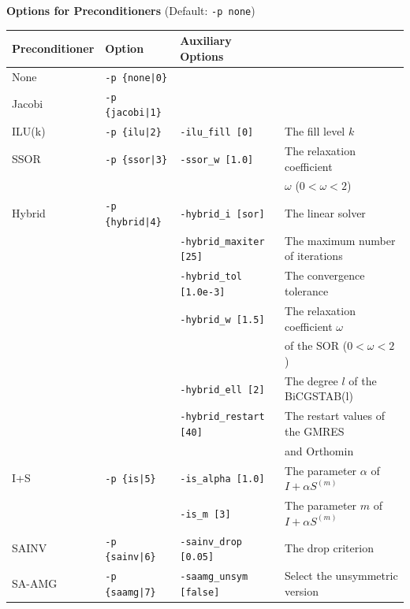 \documentclass[a4paper]{article}
\begin{document}
\begin{minipage}[t]{\textwidth}
\begin{center}
{\bf Options for Preconditioners} (Default: \verb=-p none=)\\
\begin{tabular}{l|lll}\hline\hline
Preconditioner   & Option           & Auxiliary Options \\ \hline
None     & \verb=-p {none|0}=    &   \\
Jacobi   & \verb=-p {jacobi|1}=  &     \\
ILU(k)   & \verb=-p {ilu|2}=     & \verb=-ilu_fill [0]=        & The fill level $k$ \\
SSOR     & \verb=-p {ssor|3}=    & \verb=-ssor_w [1.0]=        & The relaxation coefficient \\
         &                       &                             & $\omega$ ($0<\omega<2$) \\
Hybrid   & \verb=-p {hybrid|4}=  & \verb=-hybrid_i [sor]=      & The linear solver\\
         &                       & \verb=-hybrid_maxiter [25]= & The maximum number of iterations \\
         &                       & \verb=-hybrid_tol [1.0e-3]= & The convergence tolerance \\
         &                       & \verb=-hybrid_w [1.5]=      & The relaxation coefficient $\omega$ \\
         &                       &                             & of the SOR ($0<\omega<2$) \\
         &                       & \verb=-hybrid_ell [2]=      & The degree $l$ of the BiCGSTAB(l) \\
         &                       & \verb=-hybrid_restart [40]= & The restart values of the GMRES \\
         &                       &                             & and Orthomin \\
I+S      & \verb=-p {is|5}=      & \verb=-is_alpha [1.0]=      & The parameter $\alpha$ of $I+\alpha S^{(m)}$ \\
         &                       & \verb=-is_m [3]=            & The parameter $m$ of $I+\alpha S^{(m)}$ \\
SAINV    & \verb=-p {sainv|6}=   & \verb=-sainv_drop [0.05]=   & The drop criterion\\
SA-AMG   & \verb=-p {saamg|7}=   & \verb=-saamg_unsym [false]= & Select the unsymmetric version    \\

\end{tabular}
\end{center}
\end{minipage}
\end{document}
